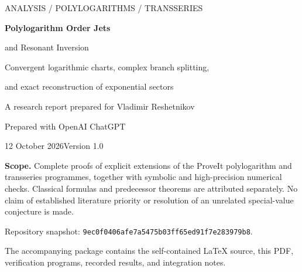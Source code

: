 \documentclass[11pt,a4paper]{article}
\numberwithin{equation}{section}
\theoremstyle{definition}
\theoremstyle{remark}
\newcommand{\snapshot}{\texttt{9ec0f0406afe7a5475b03ff65ed91f7e283979b8}}
\begin{document}
\hypersetup{pageanchor=false}
\begin{titlepage}
\vspace*{14mm}
{\color{accent}\large ANALYSIS / POLYLOGARITHMS / TRANSSERIES\par}
\vspace{10mm}
{\color{ink}\Huge\bfseries Polylogarithm Order Jets\par and Resonant Inversion\par}
\vspace{7mm}
{\Large Convergent logarithmic charts, complex branch splitting,\par
and exact reconstruction of exponential sectors\par}
\vspace{12mm}
{\large A research report prepared for Vladimir Reshetnikov\par}
\vspace{3mm}
{Prepared with OpenAI ChatGPT\par}
\vspace{8mm}
{12 October 2026\quad\textbullet\quad Version 1.0\par}
\vfill
\noindent\colorbox{light}{\parbox{0.92\textwidth}{\vspace{3mm}
\textbf{Scope.} Complete proofs of explicit extensions of the ProveIt
polylogarithm and transseries programmes, together with symbolic and
high-precision numerical checks. Classical formulas and predecessor
theorems are attributed separately. No claim of established literature
priority or resolution of an unrelated special-value conjecture is made.
\vspace{3mm}}}\par
\vspace{8mm}
\noindent Repository snapshot: \snapshot.\par
\noindent The accompanying package contains the self-contained \LaTeX{}
source, this PDF, verification programs, recorded results, and integration notes.
\end{titlepage}
\hypersetup{pageanchor=true}
\end{document}
